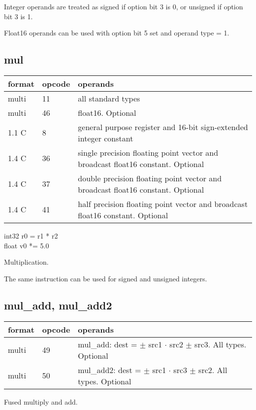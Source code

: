 \documentclass[forwardcom.tex]{subfiles}
\begin{document}
Integer operands are treated as signed if option bit 3 is 0, or unsigned if option bit 3 is 1.
\vv

Float16 operands can be used with option bit 5 set and operand type = 1.
\vv


\subsection{mul}
\label{table:mulInstruction}
\begin{tabular}{|p{12mm}|p{15mm}|p{100mm}|}
\hline
\bfseries format & \bfseries opcode & \bfseries operands \\ \hline
multi & 11 & all standard types \\ \hline
multi & 46 & float16. Optional \\ \hline
1.1 C &  8 & general purpose register and 16-bit sign-extended integer constant \\ \hline
1.4 C & 36 & single precision floating point vector and broadcast float16 constant. Optional \\ \hline
1.4 C & 37 & double precision floating point vector and broadcast float16 constant. Optional \\ \hline
1.4 C & 41 & half precision floating point vector and broadcast float16 constant. Optional \\ \hline
\end{tabular}
\vv

int32 r0 = r1 * r2 \\
float v0 *= 5.0
\vv

Multiplication.
\vv

The same instruction can be used for signed and unsigned integers.
\vv


\subsection{mul\_add, mul\_add2}
\label{table:mulAddInstruction}
\begin{tabular}{|p{12mm}|p{15mm}|p{100mm}|}
\hline
\bfseries format & \bfseries opcode & \bfseries operands \\ \hline
multi & 49 & mul\_add: dest = $\pm$ src1 $\cdot$ src2 $\pm$ src3. All types. Optional \\ 
multi & 50 & mul\_add2: dest = $\pm$ src1 $\cdot$ src3 $\pm$ src2. All types. Optional \\ \hline
\end{tabular}
\vv

Fused multiply and add.
\vv
\end{document}
